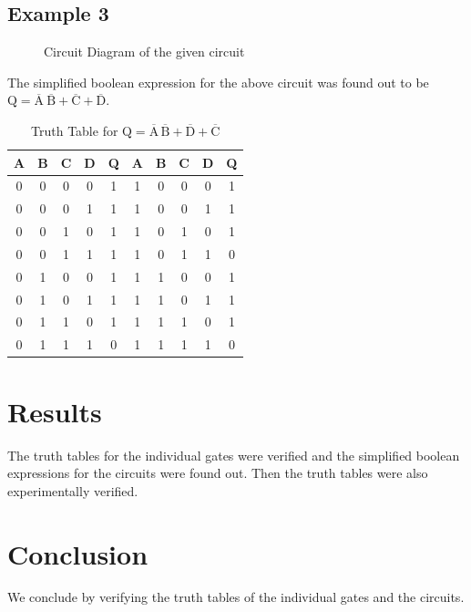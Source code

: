 \documentclass{scrartcl}
\newcommand{\1}{\mathbbm{1}}
\begin{document}
\subsection{Example 3}
\begin{figure}[H]
        \centering
        
        \caption{Circuit Diagram of the given circuit}
\end{figure}
The simplified boolean expression for the above circuit was found out to be
$\mathrm{Q = \overline{A}\ \overline{B}+ \overline{C} + \overline{D}}$.
\begin{table}[H]
        \centering
        \caption{Truth Table for \(\mathrm{ \mathrm{Q} = \overline{A}\,\overline{B} + \overline{D} + \overline{C} }\)}
        \vspace{0.2cm}
        \begin{tabular}{|c|c|c|c||c|||c|c|c|c||c|}
        \hline
        \textbf{A} & \textbf{B} & \textbf{C} & \textbf{D} & \textbf{Q} & \textbf{A} & \textbf{B} & \textbf{C} & \textbf{D} & \textbf{Q} \\
        \hline
        0 & 0 & 0 & 0 & 1 & 1 & 0 & 0 & 0 & 1 \\
        0 & 0 & 0 & 1 & 1 & 1 & 0 & 0 & 1 & 1 \\
        0 & 0 & 1 & 0 & 1 & 1 & 0 & 1 & 0 & 1 \\
        0 & 0 & 1 & 1 & 1 & 1 & 0 & 1 & 1 & 0 \\
        0 & 1 & 0 & 0 & 1 & 1 & 1 & 0 & 0 & 1 \\
        0 & 1 & 0 & 1 & 1 & 1 & 1 & 0 & 1 & 1 \\
        0 & 1 & 1 & 0 & 1 & 1 & 1 & 1 & 0 & 1 \\
        0 & 1 & 1 & 1 & 0 & 1 & 1 & 1 & 1 & 0 \\
        \hline
        \end{tabular}
\end{table}
\section{Results}
The truth tables for the individual gates were verified and the simplified boolean expressions for the circuits were found out.
Then the truth tables were also experimentally verified.
\section{Conclusion}
We conclude by verifying the truth tables of the individual gates and the circuits.
\end{document}
